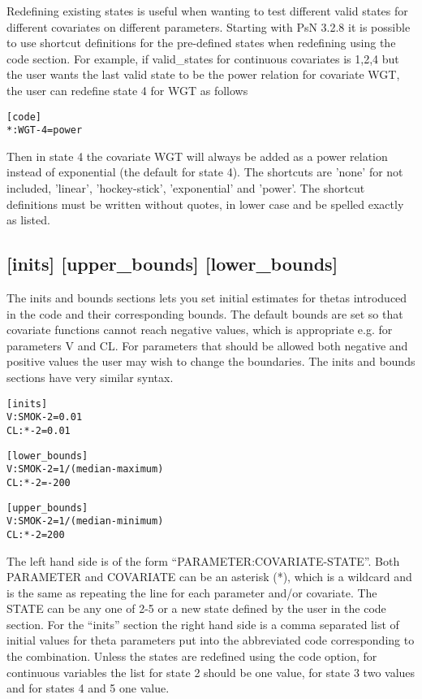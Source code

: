 Redefining existing states is useful when wanting to test different valid states for different covariates on different parameters. Starting with PsN 3.2.8 it is possible to use shortcut definitions for the pre-defined states when redefining using the code section. For example, if valid\_states for continuous covariates is 1,2,4 but the user wants the last valid state to be the power relation for covariate WGT, the user can redefine state 4 for WGT as follows
\begin{verbatim}
[code]
*:WGT-4=power
\end{verbatim}
Then in state 4 the covariate WGT will always be added as a power relation instead of exponential (the default for state 4). The shortcuts are 'none' for not included, 'linear', 'hockey-stick', 'exponential' and 'power'. The shortcut definitions must be written without quotes, in lower case and be spelled exactly as listed. 

\subsection{[inits] [upper\_bounds] [lower\_bounds]}
The inits and bounds sections lets you set initial estimates for thetas introduced in the code and their corresponding bounds. The default bounds are set so that covariate functions cannot reach negative values, which is appropriate e.g. for parameters V and CL. For parameters that should be allowed both negative and positive values the user may wish to change the boundaries. The inits and bounds sections have very similar syntax.

\begin{verbatim}
[inits]
V:SMOK-2=0.01
CL:*-2=0.01
\end{verbatim}

\begin{verbatim}
[lower_bounds]
V:SMOK-2=1/(median-maximum)
CL:*-2=-200
\end{verbatim}

\begin{verbatim}
[upper_bounds]
V:SMOK-2=1/(median-minimum)
CL:*-2=200
\end{verbatim}

The left hand side is of the form “PARAMETER:COVARIATE-STATE”. Both PARAMETER and COVARIATE can be an asterisk (*), which is a wildcard and is the same as repeating the line for each parameter and/or covariate. The STATE can be any one of 2-5 or a new state defined by the user in the code section. For the “inits” section the right hand side is a comma separated list of initial values for theta parameters put into the abbreviated code corresponding to the combination. Unless the states are redefined using the code option, for continuous variables the list for state 2 should be one value, for state 3 two values and for states 4 and 5 one value. 

